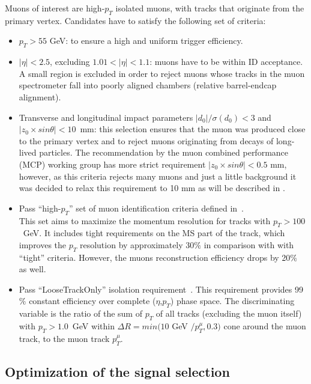 Muons of interest are high-$p_T$ isolated muons, with tracks that originate
from the primary vertex. Candidates have to satisfy the following set of criteria:
\begin{itemize}
 \item $p_T > 55$ GeV: to ensure a high and uniform trigger efficiency.
 \item $|\eta|<2.5$, excluding $1.01 < |\eta| < 1.1$: muons have to be within ID acceptance. 
 A small region is excluded in order to reject muons whose tracks in the muon spectrometer fall into poorly aligned chambers (relative barrel-endcap alignment).
 \item Transverse and longitudinal impact parameters $|d_0|/\sigma(d_0)<3$ and $|z_0\times sin\theta|<10$~mm: 
 this selection ensures that the muon was produced close to the primary vertex and to reject muons originating from decays of long-lived particles. The recommendation by the muon combined performance (MCP) working group has
 more strict requirement $|z_0 \times sin \theta| < 0.5$ mm, however, as this criteria rejects many muons and just a little background it  
 was decided to relax this requirement to 10 mm as will be described in .
 \item Pass ``high-$p_T$'' set of muon identification criteria defined in~\cite{muon_performance_2015}. \\ 
 This set aims to maximize the momentum resolution for tracks with $p_T > 100$~GeV.
 It includes tight requirements on the MS part of the track, 
 which improves the $p_T$ resolution by approximately 30$\%$ in comparison with with ``tight'' criteria.  However, the muons reconstruction efficiency drops by 20$\%$ as well.
 \item Pass ``LooseTrackOnly'' isolation requirement~\cite{muon_performance_2015}. 
 This requirement provides 99$\%$ constant efficiency over complete ($\eta$,$p_T$) phase space.
 The discriminating variable is the ratio of the sum of $p_T$ of all tracks (excluding the muon itself) with $p_T > 1.0$~GeV within $\Delta R = min(10$ GeV $/p_T^{\mu}, 0.3)$ 
 cone around the muon track, to the muon track $p_T^{\mu}$.
\end{itemize}  
 
\subsection{Optimization of the signal selection}
\label{subsec:wprime_cut_optimization}

